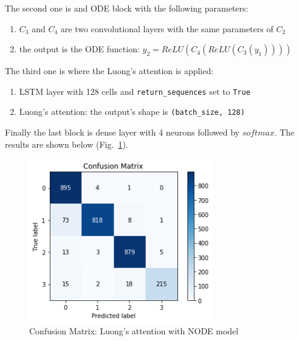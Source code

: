 \documentclass[LaM,binding=0.6cm]{sapthesis}
\begin{document}
The second one is and ODE block with the following parameters:
\begin{enumerate}
\item $C_3$ and $C_4$ are two convolutional layers with the same parameters of $C_2$
\item the output is the ODE function: $y_2=ReLU(C_4(ReLU(C_3(y_1))))$
\end{enumerate}
The third one is where the Luong's attention is applied:
\begin{enumerate}
\item LSTM layer with 128 cells and \texttt{return\_sequences} set to \texttt{True}
\item Luong's attention: the output's shape is \texttt{(batch\_size, 128)} 
\end{enumerate}
Finally the last block is dense layer with 4 neurons followed by $softmax$.
The results are shown below (Fig.~\ref{fig:lstmat3}).
\begin{figure}[H]  \centering
    \includegraphics[width=80mm,scale=0.7]{lstmat3}
    \caption{Confusion Matrix: Luong's attention with NODE model}
    \label{fig:lstmat3}
\end{figure}
\end{document}
